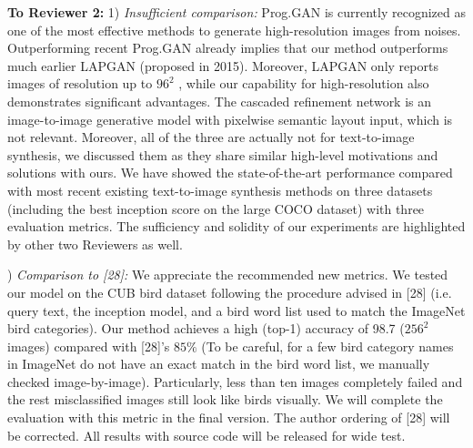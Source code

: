 \documentclass[10pt,twocolumn,letterpaper]{article}
\begin{document}

\noindent
\textbf{To Reviewer 2:} 1) \textit{Insufficient comparison: } Prog.GAN is currently recognized as one of the most effective methods to generate high-resolution images from noises. %
Outperforming recent Prog.GAN already implies that our method outperforms much earlier LAPGAN (proposed in 2015). Moreover, LAPGAN only reports images of resolution up to $96^2$ , while our capability for high-resolution also demonstrates significant advantages. The cascaded refinement network is an image-to-image generative model with pixelwise semantic layout input, which is not relevant. Moreover, all of the three are actually not for text-to-image synthesis,%
we discussed them as they share similar high-level motivations and solutions with ours. We have showed the state-of-the-art performance compared with most recent existing text-to-image synthesis methods on three datasets (including the best inception score on the large COCO dataset) with three evaluation metrics.  The sufficiency and solidity of our experiments are highlighted by other two Reviewers as well. 


) \textit{Comparison to [28]: } We appreciate the recommended new metrics. We tested our model on the CUB bird dataset following the procedure advised in [28] (i.e. query text, the inception model, and a bird word list used to match the ImageNet bird categories). Our method achieves a high (top-1) accuracy of 98.7 ($256^2$ images) compared with [28]'s $85\%$ (To be careful, for a few bird category names in ImageNet do not have an exact match in the bird word list, we manually checked image-by-image). Particularly, less than ten images completely failed and the rest misclassified images still look like birds visually. We will complete the evaluation with this metric in the final version. The author ordering of [28] will be corrected. All results with source code will be released for wide test. 

\end{document}

